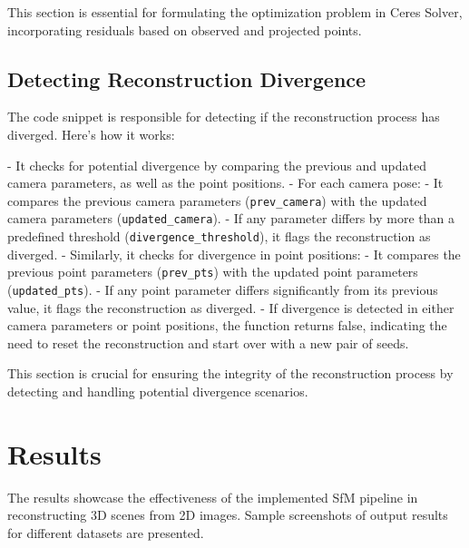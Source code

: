 \documentclass{article}
\begin{document}
This section is essential for formulating the optimization problem in Ceres Solver, incorporating residuals based on observed and projected points.


\subsection{Detecting Reconstruction Divergence}

The code snippet is responsible for detecting if the reconstruction process has diverged. Here's how it works:

- It checks for potential divergence by comparing the previous and updated camera parameters, as well as the point positions.
- For each camera pose:
  - It compares the previous camera parameters (\texttt{prev\_camera}) with the updated camera parameters (\texttt{updated\_camera}).
  - If any parameter differs by more than a predefined threshold (\texttt{divergence\_threshold}), it flags the reconstruction as diverged.
- Similarly, it checks for divergence in point positions:
  - It compares the previous point parameters (\texttt{prev\_pts}) with the updated point parameters (\texttt{updated\_pts}).
  - If any point parameter differs significantly from its previous value, it flags the reconstruction as diverged.
- If divergence is detected in either camera parameters or point positions, the function returns false, indicating the need to reset the reconstruction and start over with a new pair of seeds.

This section is crucial for ensuring the integrity of the reconstruction process by detecting and handling potential divergence scenarios.

\newpage
\section{Results}

The results showcase the effectiveness of the implemented SfM pipeline in reconstructing 3D scenes from 2D images. Sample screenshots of output results for different datasets are presented.
\end{document}
